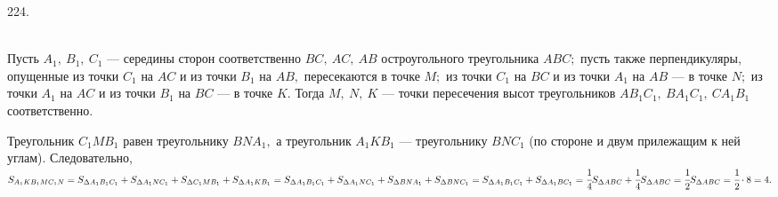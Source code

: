 224. \begin{figure}[ht!]
\end{figure}\\
Пусть $A_1,\ B_1,\ C_1$ --- середины сторон соответственно $BC,\ AC,\ AB$ остроугольного треугольника $ABC;$ пусть также перпендикуляры, опущенные из точки $C_1$ на $AC$ и из точки $B_1$ на $AB,$ пересекаются в точке $M;$ из точки $C_1$ на $BC$ и из точки $A_1$ на $AB$ --- в точке $N;$ из точки $A_1$ на $AC$ и из точки $B_1$ на $BC$ --- в точке $K.$ Тогда $M,\ N,\ K$ --- точки пересечения высот треугольников $AB_1C_1,\ BA_1C_1,\ CA_1B_1$ соответственно.

Треугольник $C_1MB_1$ равен треугольнику $BNA_1,$ а треугольник $A_1KB_1$ --- треугольнику $BNC_1$ (по стороне и двум прилежащим к ней углам). Следовательно,
$S_{A_1KB_1MC_1N} = S_{\Delta A_1B_1C_1} + S_{\Delta A_1NC_1} + S_{\Delta C_1MB_1} + S_{\Delta A_1KB_1}
= S_{\Delta A_1B_1C_1} + S_{\Delta A_1NC_1} + S_{\Delta BNA_1} + S_{\Delta BNC_1}
= S_{\Delta A_1B_1C_1} + S_{\Delta A_1BC_1} = \cfrac{1}{4}S_{\Delta ABC} + \cfrac{1}{4}S_{\Delta ABC} = \cfrac{1}{2}S_{\Delta ABC}=\cfrac{1}{2}\cdot 8=4.$\\
